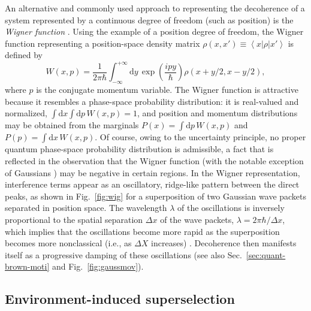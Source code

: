 \documentclass[3p,sort&compress,12pt]{elsarticle}
\newcommand{\bra}[1]{\left\langle{#1}\right\vert}
\newcommand{\ket}[1]{\left\vert{#1}\right\rangle}
\newcommand{\D}{\ensuremath{\mathrm{d}}}
\newcommand{\I}{\ensuremath{i}}
\newcommand{\op}[1]{#1}
\begin{document}
An alternative and commonly used approach to representing the decoherence of a system represented by a continuous degree of freedom (such as position) is the \emph{Wigner function} \cite{Wigner:1932:un,Hillery:1984:tv}. Using the example of a position degree of freedom, the Wigner function representing a position-space density matrix $\rho(x,x') \equiv \bra{x}\op{\rho}\ket{x'}$ is defined by 
%
\begin{equation}
  \label{eq:fsoifhwddfs6611a}
W(x,p) = \frac{1}{2\pi\hbar} \int_{-\infty}^{+\infty} \D y \, \exp\left( \frac{\I p
  y}{\hbar}\right) \rho(x+y/2,x-y/2),
\end{equation}
%
where $p$ is the conjugate momentum variable. The Wigner function is attractive because it resembles a phase-space probability distribution: it is real-valued and normalized, $\int \D x \int \D p \,W(x,p) = 1$, and position and momentum distributions may be obtained from the marginals $P(x) = \int \D p \, W(x,p) $ and $P(p) = \int \D x \, W(x,p)$. Of course, owing to the uncertainty principle, no proper quantum phase-space probability distribution is admissible, a fact that is reflected in the observation that the Wigner function (with the notable exception of Gaussians \cite{Hudson:1974:ra}) may be negative in certain regions. In the Wigner representation, interference terms appear as an oscillatory, ridge-like pattern between the direct peaks, as shown in Fig.~\ref{fig:wig} for a superposition of two Gaussian wave packets separated in position space. The wavelength $\lambda$ of the oscillations is inversely proportional to the spatial separation $\Delta x$ of the wave packets, $\lambda =2\pi\hbar/\Delta x$, which implies that the oscillations become more rapid as the superposition becomes more nonclassical (i.e., as $\Delta X$ increases) \cite{Zurek:2002:ii,Schlosshauer:2007:un}. Decoherence then manifests itself as a progressive damping of these oscillations (see also Sec.~\ref{sec:quant-brown-moti} and Fig.~\ref{fig:gaussmov}). 

\subsection{\label{sec:envir-induc-supers}Environment-induced superselection}
\end{document}

